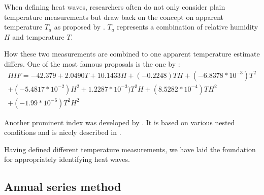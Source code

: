 \documentclass[12pt]{article}
\begin{document}
When defining heat waves, researchers often do not only consider plain temperature measurements but draw back on the concept on apparent temperature $T_a$ as proposed by \citet{steadman1984}. $T_a$ represents a combination of relative humidity $H$ and temperature $T$.

How these two measurements are combined to one apparent temperature estimate differs. One of the most famous proposals is the one by \citet{el2007}:
\begin{equation}
\begin{split}
HIF = -42.379 + 2.0490 T + 10.1433H + (-0.2248)TH + (-6.8378*10^{-3})T^2 \\ + (-5.4817*10^{-2})H^2 + 1.2287*10^{-3})T^2H + (8.5282*10^{-4})TH^2 \\
+ (-1.99*10^{-6})T^2H^2
\end{split}
\end{equation}

Another prominent index was developed by \citet{nws2011}. It is based on various nested conditions and is nicely described in \citet{anderson2013}.

Having defined different temperature measurements, we have laid the foundation for appropriately identifying heat waves.

\subsection{Annual series method}
\end{document}
